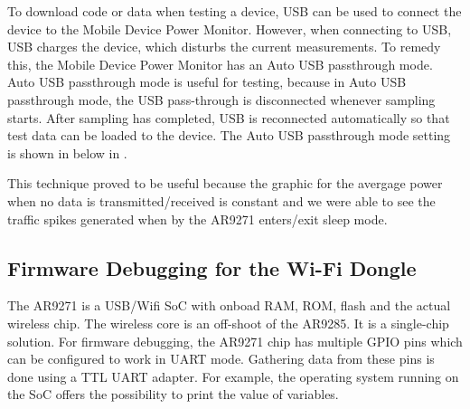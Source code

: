 To download code or data when testing a device, USB can be used to connect the device to
the Mobile Device Power Monitor. However, when connecting to USB, USB charges the
device, which disturbs the current measurements. To remedy this, the Mobile Device Power
Monitor has an Auto USB passthrough mode. Auto USB passthrough mode is useful
for testing, because in Auto USB passthrough mode, the USB pass-through is
disconnected whenever sampling starts. After sampling has completed, USB is reconnected
automatically so that test data can be loaded to the device. The Auto USB passthrough
mode setting is shown in below in .

This technique proved to be useful because the graphic for the avergage power when no data is transmitted/received is constant and we were able to see the traffic spikes generated when by the AR9271 enters/exit sleep mode.


\subsection{Firmware Debugging for the Wi-Fi Dongle}
\label{sec:firmwaredebugging}

The AR9271 is a USB/Wifi SoC with onboad RAM, ROM, flash and the actual wireless chip.  The wireless core is an off-shoot of the AR9285. It is a single-chip solution. For firmware debugging, the AR9271 chip has multiple GPIO pins which can be configured to work in UART mode.  Gathering data from these pins is done using a TTL UART adapter. For example, the operating system running on the SoC offers the possibility to print the value of variables.




 










